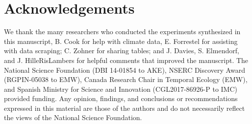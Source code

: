 \documentclass{article}
\begin{document}



\section*{Acknowledgements}
We thank the many researchers who conducted the experiments synthesized in this manuscript, B. Cook for help with climate data, E. Forrestel for assisting with data scraping; C. Zohner for sharing tables; and J. Davies, S. Elmendorf, and J. HilleRisLambers for helpful comments that improved the manuscript. The National Science Foundation (DBI 14-01854 to AKE), NSERC Discovery Award (RGPIN-05038 to EMW), Canada Research Chair in Temporal Ecology (EMW), and Spanish Ministry for Science and Innovation (CGL2017-86926-P to IMC) provided funding. Any opinion, findings, and conclusions or recommendations expressed in this material are those of the authors and do not necessarily reflect the views of the National Science Foundation.
\end{document}
